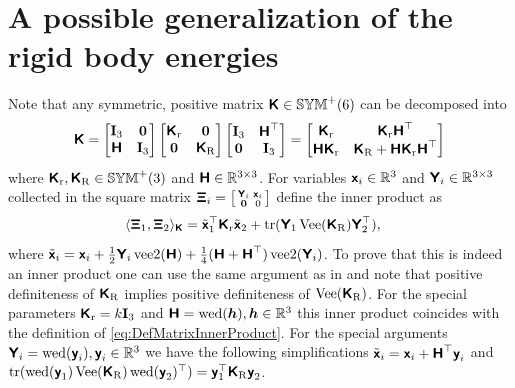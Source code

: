 \chapter{A possible generalization of the rigid body energies}\label{sec:GenRigidBodyPotential}
Note that any symmetric, positive matrix $\protoK \in \SymMatP(6)$ can be decomposed into
\begin{align}
 \protoK
 = \begin{bmatrix} \idMat[3] & \mat{0} \\ \protoH & \idMat[3] \end{bmatrix}
   \begin{bmatrix} \protoKr & \mat{0} \\ \mat{0} & \protoKR \end{bmatrix}
   \begin{bmatrix} \idMat[3] & \protoH^\top \\ \mat{0} & \idMat[3] \end{bmatrix}
 = \begin{bmatrix} \protoKr & \protoKr \protoH^\top\\ \protoH \protoKr & \protoKR + \protoH \protoKr \protoH^\top \end{bmatrix}
\end{align}
where $\protoKr, \protoKR \in \SymMatP(3)$ and $\protoH \in \RealNum^{3\times3}$.
For variables $\protox_i \in \RealNum^3$ and $\protoY_i \in \RealNum^{3\times3}$ collected in the square matrix $\protoXi_i = \left[\begin{smallmatrix} \protoY_i & \protox_i \\ \mat{0} & 0 \end{smallmatrix}\right]$ define the inner product as
\begin{align}\label{eq:DefGenRogodBodyInnerProduct} 
 \sProd[\protoK]{\protoXi_1}{\protoXi_2} &= \tilde{\protox}_1^\top \protoKr \tilde{\protox}_2 + \tr(\protoY_1 \veeMatOp(\protoKR) \protoY_2^\top),
\end{align}
where $\tilde{\protox}_i = \protox_i + \tfrac{1}{2} \protoY_i\veeTwoOp(\protoH) + \tfrac{1}{4}(\protoH+\protoH^\top)\veeTwoOp(\protoY_i)$.
To prove that this is indeed an inner product one can use the same argument as in  and note that positive definiteness of $\protoKR$ implies positive definiteness of $\veeMatOp(\protoKR)$.
For the special parameters $\protoKr = k\idMat[3]$ and $\protoH = \wedOp(\tuple{h}), \tuple{h}\in\RealNum^3$ this inner product coincides with the definition of \eqref{eq:DefMatrixInnerProduct}.
For the special arguments $\protoY_i = \wedOp(\protoy_i), \protoy_i\in \RealNum^3$ we have the following simplifications $\tilde{\protox}_i = \protox_i + \protoH^\top \protoy_i$ and $\tr(\wedOp(\protoy_1) \veeMatOp(\protoKR) \wedOp(\protoy_2)^\top) = \protoy_1^\top \protoKR \protoy_2$.
